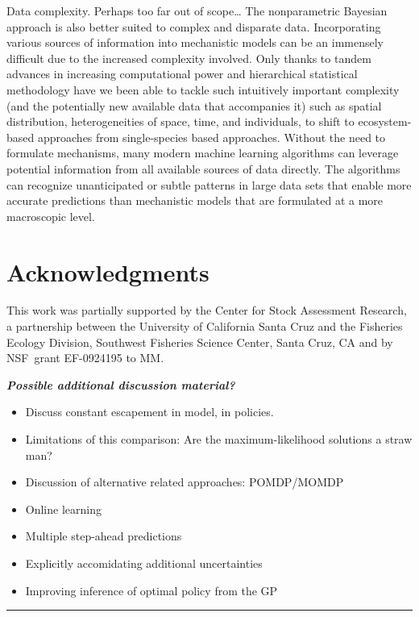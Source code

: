 \documentclass[author-year, review]{elsarticle} %
\begin{document}
 Data complexity. Perhaps too far out of scope\ldots{} The nonparametric
Bayesian approach is also better suited to complex and disparate data.
Incorporating various sources of information into mechanistic models can
be an immensely difficult due to the increased complexity involved. Only
thanks to tandem advances in increasing computational power and
hierarchical statistical methodology have we been able to tackle such
intuitively important complexity (and the potentially new available data
that accompanies it) such as spatial distribution, heterogeneities of
space, time, and individuals, to shift to ecosystem-based approaches
from single-species based approaches. Without the need to formulate
mechanisms, many modern machine learning algorithms can leverage
potential information from all available sources of data directly. The
algorithms can recognize unanticipated or subtle patterns in large data
sets that enable more accurate predictions than mechanistic models that
are formulated at a more macroscopic level.

\section{Acknowledgments}

This work was partially supported by the Center for Stock Assessment
Research, a partnership between the University of California Santa Cruz
and the Fisheries Ecology Division, Southwest Fisheries Science Center,
Santa Cruz, CA and by NSF~grant EF-0924195 to MM.

 \textbf{\emph{Possible additional discussion material?}}

\begin{itemize}
\item
  Discuss constant escapement in model, in policies.
\item
  Limitations of this comparison: Are the maximum-likelihood solutions a
  straw man?
\item
  Discussion of alternative related approaches: POMDP/MOMDP
\item
  Online learning
\item
  Multiple step-ahead predictions
\item
  Explicitly accomidating additional uncertainties
\item
  Improving inference of optimal policy from the GP 
\end{itemize}

\begin{center}\rule{3in}{0.4pt}\end{center}
\end{document}
